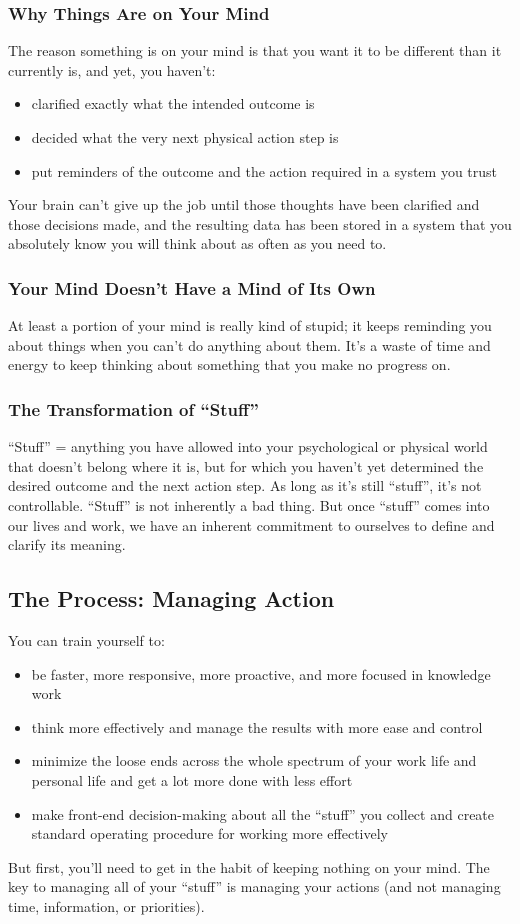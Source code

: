 \documentclass[letterpaper]{article}
\begin{document}
\subsubsection*{Why Things Are on Your Mind}
The reason something is on your mind is that you want it to be different than it currently is, and yet, you haven't:
\begin{itemize}
\item clarified exactly what the intended outcome is
\item decided what the very next physical action step is
\item put reminders of the outcome and the action required in a system you trust
\end{itemize}
Your brain can't give up the job until those thoughts have been clarified and those decisions made, and the resulting data has been stored in a system that you absolutely know you will think about as often as you need to.

\subsubsection*{Your Mind Doesn't Have a Mind of Its Own}
At least a portion of your mind is really kind of stupid; it keeps reminding you about things when you can't do anything about them. It's a waste of time and energy to keep thinking about something that you make no progress on.

\subsubsection*{The Transformation of ``Stuff''}
``Stuff'' = anything you have allowed into your psychological or physical world that doesn't belong where it is, but
for which you haven't yet determined the desired outcome and the next action step. As long as it's still ``stuff'', it's not controllable. ``Stuff'' is not inherently a bad thing. But once ``stuff'' comes into our lives and work, we have an inherent commitment to ourselves to define and clarify its meaning.

\subsection{The Process: Managing Action}
You can train yourself to:
\begin{itemize}
\item be faster, more responsive, more proactive, and more focused in knowledge work
\item think more effectively and manage the results with more ease and control
\item minimize the loose ends across the whole spectrum of your work life and personal life and get a lot more done with less effort
\item make front-end decision-making about all the ``stuff'' you collect and create standard operating procedure for working more effectively
\end{itemize}
But first, you'll need to get in the habit of keeping nothing on your mind. The key to managing all of your ``stuff'' is managing your actions (and not managing time, information, or priorities).
\end{document}
